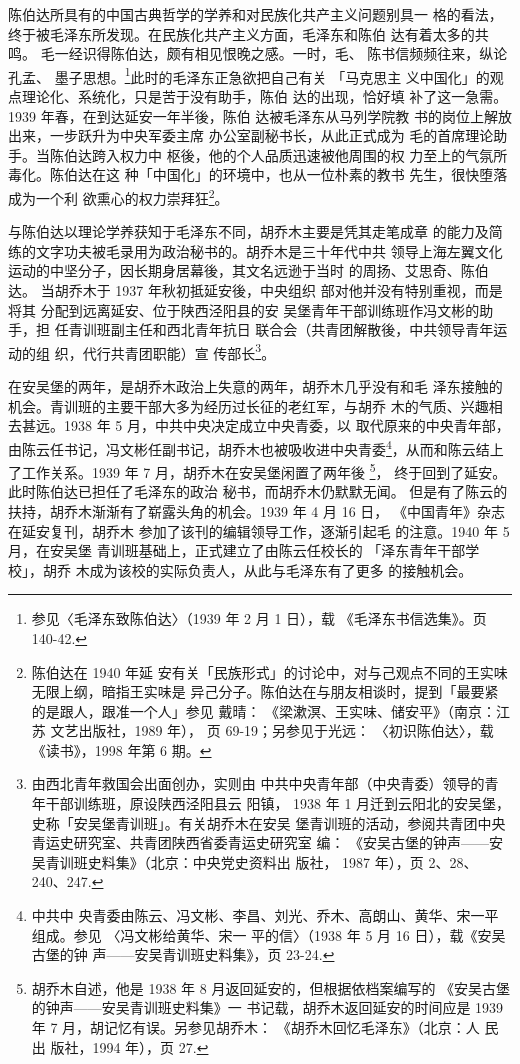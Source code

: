 陈伯达所具有的中国古典哲学的学养和对民族化共产主义问题别具一 格的看法，
终于被毛泽东所发现。在民族化共产主义方面，毛泽东和陈伯 达有着太多的共鸣。
毛一经识得陈伯达，颇有相见恨晚之感。一时，毛、 陈书信频频往来，纵论孔孟、
墨子思想。\footnote{参见〈毛泽东致陈伯达〉（1939 年 2 月 1 日），载
《毛泽东书信选集》。页 140-42.}此时的毛泽东正急欲把自己有关 「马克思主
义中国化」的观点理论化、系统化，只是苦于没有助手，陈伯 达的出现，恰好填
补了这一急需。1939 年春，在到达延安一年半後，陈伯 达被毛泽东从马列学院教
书的岗位上解放出来，一步跃升为中央军委主席 办公室副秘书长，从此正式成为
毛的首席理论助手。当陈伯达跨入权力中 枢後，他的个人品质迅速被他周围的权
力至上的气氛所毒化。陈伯达在这 种「中国化」的环境中，也从一位朴素的教书
先生，很快堕落成为一个利 欲熏心的权力崇拜狂\footnote{陈伯达在 1940 年延
安有关「民族形式」的讨论中，对与己观点不同的王实味无限上纲，暗指王实味是
异己分子。陈伯达在与朋友相谈时，提到「最要紧的是跟人，跟准一个人」参见
戴晴： 《梁漱溟、王实味、储安平》（南京：江苏 文艺出版社，1989 年），
页 69-19；另参见于光远： 〈初识陈伯达〉，载《读书》，1998 年第 6 期。}。

与陈伯达以理论学养获知于毛泽东不同，胡乔木主要是凭其走笔成章 的能力及简
练的文字功夫被毛录用为政治秘书的。胡乔木是三十年代中共 领导上海左翼文化
运动的中坚分子，因长期身居幕後，其文名远逊于当时 的周扬、艾思奇、陈伯达。
当胡乔木于 1937 年秋初抵延安後，中央组织 部对他并没有特别重视，而是将其
分配到远离延安、位于陕西泾阳县的安 吴堡青年干部训练班作冯文彬的助手，担
任青训班副主任和西北青年抗日 联合会（共青团解散後，中共领导青年运动的组
织，代行共青团职能）宣 传部长\footnote{由西北青年救国会出面创办，实则由
中共中央青年部（中央青委）领导的青年干部训练班，原设陕西泾阳县云 阳镇，
1938 年 1 月迁到云阳北的安吴堡，史称「安吴堡青训班」。有关胡乔木在安吴
堡青训班的活动，参阅共青团中央 青运史研究室、共青团陕西省委青运史研究室
编： 《安吴古堡的钟声——安吴青训班史料集》（北京：中央党史资料出 版社，
1987 年），页 2、28、240、247.  }。

在安吴堡的两年，是胡乔木政治上失意的两年，胡乔木几乎没有和毛 泽东接触的
机会。青训班的主要干部大多为经历过长征的老红军，与胡乔 木的气质、兴趣相
去甚远。1938 年 5 月，中共中央决定成立中央青委，以 取代原来的中央青年部，
由陈云任书记，冯文彬任副书记，胡乔木也被吸收进中央青委\footnote{中共中
央青委由陈云、冯文彬、李昌、刘光、乔木、高朗山、黄华、宋一平组成。参见
〈冯文彬给黄华、宋一 平的信〉（1938 年 5 月 16 日），载《安吴古堡的钟
声——安吴青训班史料集》，页 23-24.}，从而和陈云结上了工作关系。1939 年 7
月，胡乔木在安吴堡闲置了两年後
\footnote{胡乔木自述，他是 1938 年 8 月返回延安的，但根据依档案编写的
《安吴古堡的钟声——安吴青训班史料集》一 书记载，胡乔木返回延安的时间应是
1939 年 7 月，胡记忆有误。另参见胡乔木： 《胡乔木回忆毛泽东》（北京：人
民出 版社，1994 年），页 27.}， 终于回到了延安。此时陈伯达已担任了毛泽东的政治 秘书，而胡乔木仍默默无闻。
但是有了陈云的扶持，胡乔木渐渐有了崭露头角的机会。1939 年 4 月 16 日，
《中国青年》杂志在延安复刊，胡乔木 参加了该刊的编辑领导工作，逐渐引起毛
的注意。1940 年 5 月，在安吴堡 青训班基础上，正式建立了由陈云任校长的
「泽东青年干部学校」，胡乔 木成为该校的实际负责人，从此与毛泽东有了更多
的接触机会。

